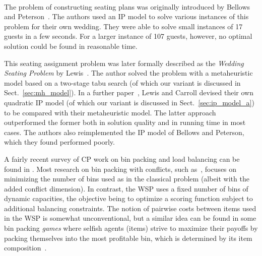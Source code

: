 \documentclass{llncs}
\begin{document}
%

\paragraph{}The problem of constructing seating plans was originally introduced by Bellows and Peterson~\cite{Bellows2012}. The authors used an IP model to solve various instances of this problem for their own wedding. They were able to solve small instances of 17 guests in a few seconds. For a larger instance of 107 guests, however, no optimal solution could be found in reasonable time.

This seating assignment problem was later formally described as the \emph{Wedding Seating Problem} by Lewis~\cite{Lewis2013}. The author solved the problem with a metaheuristic model based on a two-stage tabu search (of which our variant is discussed in Sect.~\ref{sec:mh_model}). In a further paper~\cite{Lewis2016}, Lewis and Carroll devised their own quadratic IP model (of which our variant is discussed in Sect.~\ref{sec:ip_model_a}) to be compared with their metaheuristic model. The latter approach outperformed the former both in solution quality and in running time in most cases. The authors also reimplemented the IP model of Bellows and Peterson, which they found performed poorly.

A fairly recent survey of CP work on bin packing and load balancing can be found in \cite{Schaus2009}. Most research on bin packing with conflicts, such as~\cite{Sadykov2013}, focuses on minimizing the number of bins used as in the classical problem (albeit with the added conflict dimension). In contrast, the WSP uses a fixed number of bins of dynamic capacities, the objective being to optimize a scoring function subject to additional balancing constraints. The notion of pairwise costs between items used in the WSP is somewhat unconventional, but a similar idea can be found in some bin packing \emph{games} where selfish agents (items) strive to maximize their payoffs by packing themselves into the most profitable bin, which is determined by its item composition~\cite{Wang2015}.


\end{document}
